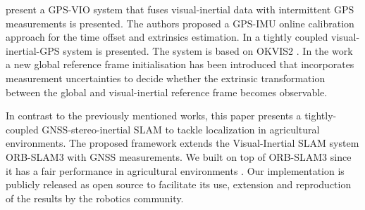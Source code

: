 \citet{lee2020intermittent} present a GPS-VIO system that fuses visual-inertial data with intermittent GPS measurements is presented. The authors proposed a GPS-IMU online calibration approach for the time offset and extrinsics estimation. In \cite{boche2022dropout} a tightly coupled visual-inertial-GPS system is presented. The system is based on OKVIS2 \cite{leutenegger2022okvis2}. In the work a new global reference frame initialisation has been introduced that incorporates measurement uncertainties to decide whether the extrinsic transformation between the global and visual-inertial reference frame becomes observable.

In contrast to the previously mentioned works, this paper presents a tightly-coupled GNSS-stereo-inertial SLAM to tackle localization in agricultural environments. The proposed framework extends the Visual-Inertial SLAM system ORB-SLAM3 \cite{campos2021orbslam3} with GNSS measurements. We built on top of ORB-SLAM3 since it has a fair performance in agricultural environments \cite{cremona2022evaluation}. Our implementation is publicly released as open source to facilitate its use, extension and reproduction of the results by the robotics community.

